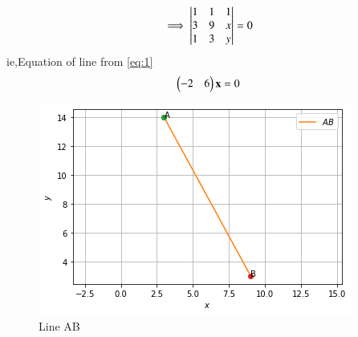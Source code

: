 \documentclass[journal,12pt,twocolumn]{IEEEtran}
\begin{document}
	
\begin{align}
\implies\begin{vmatrix}
	 1 & 1 & 1 \\ 
	 3 & 9 & x \\ 
	 1 & 3 & y\end{vmatrix}=0 \label{eq:1}
\end{align}
ie,Equation of line from \eqref{eq:1}
\begin{align}
	    \begin{pmatrix}-2 & 6\end{pmatrix}\mathbf{x}=0
\end{align}
\begin{figure}[!h]
\centering
\includegraphics[width=\columnwidth]{figure5.png}
\caption{Line AB}
\end{figure}
\end{document}

